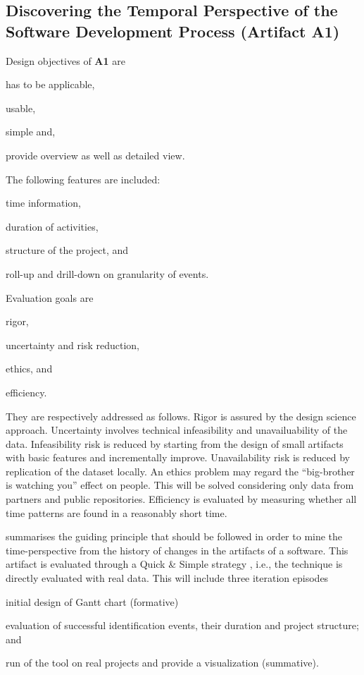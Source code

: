 \subsection{Discovering the Temporal Perspective of the Software Development Process (Artifact A1)} 
Design objectives of \textbf{A1} are \begin{iiilist}
	\item has to be applicable, 
	\item usable, 
	\item simple and,
	\item provide overview as well as detailed view.
\end{iiilist} 
The following features are included: 
\begin{iiilist}
	\item time information,
	\item duration of activities,
	\item structure of the project, and
	\item roll-up and drill-down on granularity of events.
\end{iiilist}
Evaluation goals are 
\begin{iiilist}
	\item rigor,
	\item uncertainty and risk reduction,
	\item ethics, and
	\item efficiency.
\end{iiilist}
They are respectively addressed as follows. Rigor is assured by the design science approach. Uncertainty involves technical infeasibility and unavailuability of the data. Infeasibility risk is reduced by starting from the design of small artifacts with basic features and incrementally improve. Unavailability risk is reduced by replication of the dataset locally. An ethics problem may regard the “big-brother is watching you” effect on people. This will be solved considering only data from partners and public repositories. Efficiency is evaluated by measuring whether all time patterns are found in a reasonably short time.



 summarises the guiding principle that should be followed in order to mine the time-perspective from the history of changes in the artifacts of a software. This artifact is evaluated through a Quick \& Simple strategy \citep{Venable2016}, i.e., the technique is directly evaluated with real data. This will include three iteration episodes 
\begin{iiilist}
	\item initial design of Gantt chart (formative)
	\item evaluation of successful identification events, their duration and project structure; and 
	\item run of the tool on real projects and provide a visualization (summative).
\end{iiilist}

